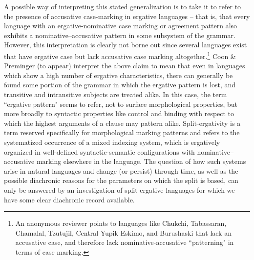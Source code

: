 \documentclass[output=paper,
modfonts
]{LSP/langsci}
\begin{document}
A possible way of interpreting this stated generalization is to take it to refer to the presence of accusative case-marking in ergative languages -- that is, that every language with an ergative-nominative case marking or agreement pattern also exhibits a nominative--accusative  pattern in some subsystem of the grammar.  However, this interpretation is clearly not borne out since several languages exist that   have ergative case but lack  accusative case marking altogether.\footnote{An anonymous reviewer points to  languages  like Chukchi,  Tabassaran, Chamalal, Tzutujil, Central Yupik Eskimo, and  Burushaski that lack an accusative case, and therefore lack nominative-accusative ``patterning" in terms of case marking.}  Coon \& Preminger (to appear)  interpret the above claim  to mean that even in languages  which show a high number of ergative characteristics,  there can generally be found some portion of the grammar in which the
ergative pattern is lost, and transitive and intransitive subjects are treated alike. In this case, the term ``ergative pattern" seems to refer, not to surface morphological  properties, but more broadly  to syntactic properties like control and binding with respect to which the highest arguments of a clause may pattern alike.  Split-ergativity is a term reserved specifically for morphological marking patterns and  refers to the systematized occurrence of  a mixed indexing system, which is ergatively organized  in  well-defined 
syntactic-semantic configurations with nominative--accusative marking elsewhere in the language.   The question of how such systems arise in natural languages and change (or persist) through time, as well as the possible diachronic reasons for the parameters on which the split is based,    can only be answered  by an investigation of split-ergative languages for which 
we have some clear diachronic record available.  
\end{document}
